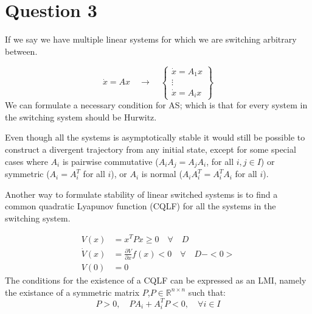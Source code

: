 \chapter{Question 3}
If we say we have multiple linear systems for which we are switching arbitrary between.

\begin{equation}
        \dot{x} = Ax \quad \rightarrow \quad
        \begin{Bmatrix}
                \dot{x} = A_1 x \\
                \vdots \\
                \dot{x} = A_i x
        \end{Bmatrix}
\end{equation}
We can formulate a necessary condition for AS; which is that for every system in the switching system should be Hurwitz.

Even though all the systems is asymptotically stable it would still be possible to construct a divergent trajectory from any initial state, except for some special cases where $A_i$ is pairwise commutative ($A_iA_j = A_j A_i$, for all $i,j \in I$) or symmetric ($A_i = A_i^T$ for all $i$), or $A_i$ is normal ($A_iA_i^T = A_i^T A_i$ for all $i$).

Another way to formulate stability of linear switched systems is to find a common quadratic Lyapunov function (CQLF) for all the systems in the switching system.

\begin{equation}
        \begin{split}
                V(x) &= x^T P x \geq 0 \quad \forall \quad D \\
                \dot{V}(x) &= \frac{\partial V}{\partial x} f(x) < 0 \quad \forall \quad D - <0> \\
                V(0) &= 0
        \end{split}
\end{equation}
The conditions for the existence of a CQLF can be expressed as an LMI, namely the existance of a symmetric matrix $P$,$P \in \mathbb{R}^{n\times n}$ such that:
\begin{equation}
        P > 0, \quad PA_i + A_i^TP < 0, \quad \forall i \in I
\end{equation}
